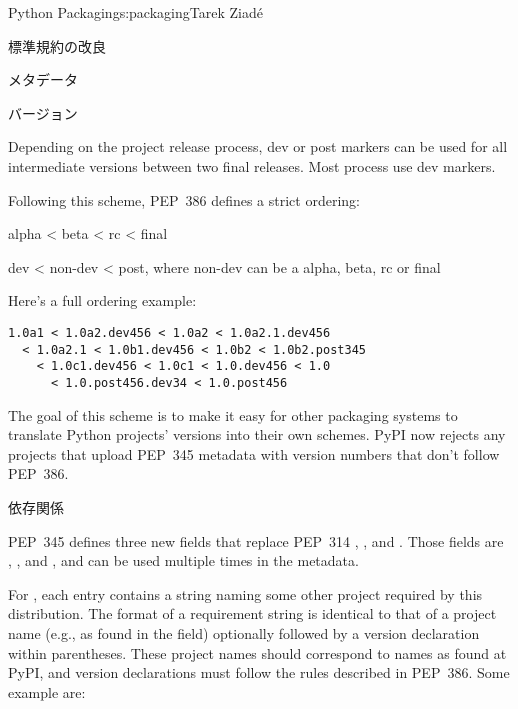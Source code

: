 \begin{aosachapter}{Python Packaging}{s:packaging}{Tarek Ziad\'{e}}
\begin{aosasect1}{標準規約の改良}
\begin{aosasect2}{メタデータ}
\begin{aosasect3}{バージョン}
\begin{aosaitemize}
\end{aosaitemize}

\noindent
Depending on the project release process, dev or post markers can be used for
all intermediate versions between two final releases. Most process use
dev markers.

\pagebreak

Following this scheme, PEP~386 defines a strict ordering:

\begin{aosaitemize}

  \item alpha {\textless} beta {\textless} rc {\textless} final

  \item dev {\textless} non-dev {\textless} post, where non-dev can be a alpha, beta,
  rc or final

\end{aosaitemize}

\noindent
Here's a full ordering example:

\begin{verbatim}
1.0a1 < 1.0a2.dev456 < 1.0a2 < 1.0a2.1.dev456
  < 1.0a2.1 < 1.0b1.dev456 < 1.0b2 < 1.0b2.post345
    < 1.0c1.dev456 < 1.0c1 < 1.0.dev456 < 1.0
      < 1.0.post456.dev34 < 1.0.post456
\end{verbatim}

\noindent
The goal of this scheme is to make it easy for other packaging systems
to translate Python projects' versions into their own schemes.  PyPI
now rejects any projects that upload PEP~345 metadata with version numbers
that don't follow PEP~386.

\end{aosasect3}

\begin{aosasect3}{依存関係}

PEP~345 defines three new fields that replace PEP~314 ,
, and . Those fields are
, , and ,
and can be used multiple times in the metadata.

For , each entry contains a string naming some
other  project required by this distribution.  The
format of a requirement string is identical to that of a
 project name (e.g., as found in the  field)
optionally followed by a version declaration within parentheses.
These  project names should correspond to names as
found at PyPI, and version declarations must follow the rules
described in PEP~386. Some example are:


\end{aosasect3}
\end{aosasect2}
\end{aosasect1}
\end{aosachapter}
